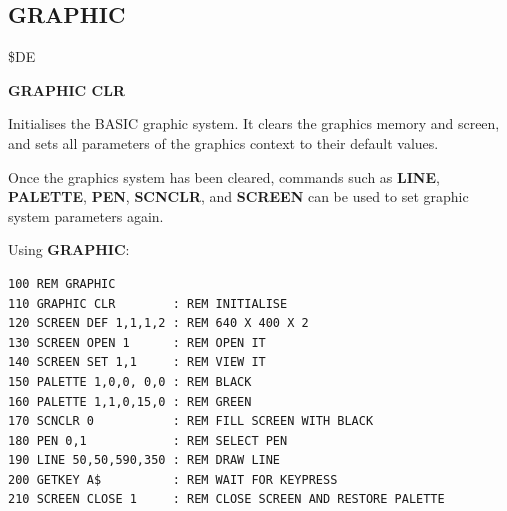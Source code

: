 \newpage
\subsection{GRAPHIC}
\begin{description}[leftmargin=2cm,style=nextline]
\item [Token:] \$DE
\item [Format:] {\bf GRAPHIC CLR}
\item [Usage:] Initialises the BASIC graphic system.
               It clears the graphics memory and screen, and sets
               all parameters of the graphics context to their
               default values.

               Once the graphics system has been cleared, commands such as {\bf LINE},
               {\bf PALETTE}, {\bf PEN}, {\bf SCNCLR}, and {\bf SCREEN} can be
               used to set graphic system parameters again.

\item [Example:] Using {\bf GRAPHIC}:
\begin{tcolorbox}[colback=black,coltext=white]
\verbatimfont{\codefont}
\begin{verbatim}
100 REM GRAPHIC
110 GRAPHIC CLR        : REM INITIALISE
120 SCREEN DEF 1,1,1,2 : REM 640 X 400 X 2
130 SCREEN OPEN 1      : REM OPEN IT
140 SCREEN SET 1,1     : REM VIEW IT
150 PALETTE 1,0,0, 0,0 : REM BLACK
160 PALETTE 1,1,0,15,0 : REM GREEN
170 SCNCLR 0           : REM FILL SCREEN WITH BLACK
180 PEN 0,1            : REM SELECT PEN
190 LINE 50,50,590,350 : REM DRAW LINE
200 GETKEY A$          : REM WAIT FOR KEYPRESS
210 SCREEN CLOSE 1     : REM CLOSE SCREEN AND RESTORE PALETTE
\end{verbatim}
\end{tcolorbox}
\end{description}


\newpage
